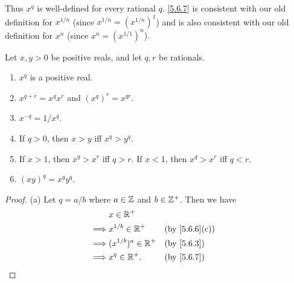 \begin{note}
  Thus \(x^q\) is well-defined for every rational \(q\).
  \cref{5.6.7} is consistent with our old definition for \(x^{1 / n}\) (since \(x^{1 / n} = (x^{1 / n})^1\)) and is also consistent with our old definition for \(x^n\) (since \(x^n = (x^{1 / 1})^n\)).
\end{note}

\begin{lem}\label{5.6.9}
  Let \(x, y > 0\) be positive reals, and let \(q, r\) be rationals.
  \begin{enumerate}
    \item \(x^q\) is a positive real.
    \item \(x^{q + r} = x^q x^r\) and \((x^q)^r = x^{qr}\).
    \item \(x^{-q} = 1 / x^q\).
    \item If \(q > 0\), then \(x > y\) iff \(x^q > y^q\).
    \item If \(x > 1\), then \(x^q > x^r\) iff \(q > r\).
          If \(x < 1\), then \(x^q > x^r\) iff \(q < r\).
    \item \((xy)^q = x^q y^q\).
  \end{enumerate}
\end{lem}

\begin{proof}{(a)}
  Let \(q = a / b\) where \(a \in \mathbb{Z}\) and \(b \in \mathbb{Z}^+\).
  Then we have
  \begin{align*}
             & x \in \R^+                                              \\
    \implies & x^{1 / b} \in \R^+     &  & \text{(by \cref{5.6.6}(c))} \\
    \implies & (x^{1 / b})^a \in \R^+ &  & \by{5.6.3}                  \\
    \implies & x^q \in \R^+.          &  & \by{5.6.7}
  \end{align*}
\end{proof}

